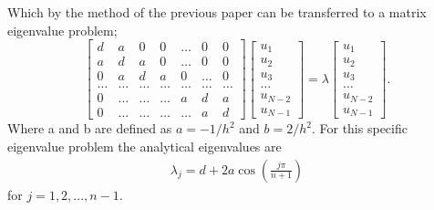 \documentclass{emulateapj}
\begin{document}
Which by the method of the previous paper can be transferred to a matrix eigenvalue problem;
%
\begin{equation*}
    \begin{bmatrix} d& a & 0   & 0    & \dots  &0     & 0 \\
                                a & d & a & 0    & \dots  &0     &0 \\
                                0   & a & d & a  &0       &\dots & 0\\
                                \dots  & \dots & \dots & \dots  &\dots      &\dots & \dots\\
                                0   & \dots & \dots & \dots  &a  &d & a\\
                                0   & \dots & \dots & \dots  &\dots       &a & d\end{bmatrix} 
                                 \begin{bmatrix} u_1 \\ u_2 \\ u_3 \\ \dots \\ u_{N-2} \\ u_{N-1}\end{bmatrix} = \lambda \begin{bmatrix} u_1 \\ u_2 \\ u_3 \\ \dots \\ u_{N-2} \\ u_{N-1}\end{bmatrix} . 
\label{eq:matrixse} 
\end{equation*}
%
Where a and b are defined as $a = -1/h^2$ and $b = 2/h^2$. For this specific eigenvalue problem the analytical eigenvalues are
%
\begin{gather}\label{eq:eigenvals_analytical}
    \lambda_j = d + 2a\cos\left(\frac{j\pi}{n+1}\right)
\end{gather}
for $j = 1,2,...,n-1$. 
\end{document}
